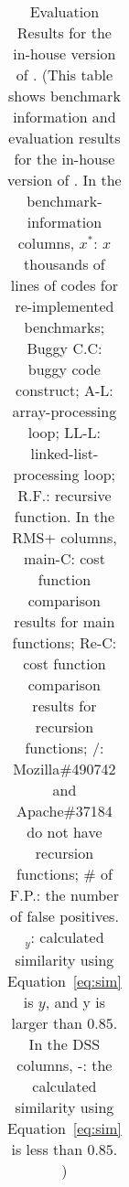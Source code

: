 \begin{table}[h!]
{{\begin{tabular}{lccccccccccc}


    \bottomrule
   \end{tabular}
   }
   }
   \caption{Evaluation Results for the in-house version of \Tool.
  \footnotesize{(This table shows benchmark information and evaluation results for the in-house version of \Tool. In the benchmark-information columns,
   $x^*$: $x$ thousands of lines of codes for re-implemented benchmarks; 
   Buggy C.C: buggy code construct;
   A-L: array-processing loop; 
   LL-L: linked-list-processing loop;
   R.F.: recursive function.
   In the RMS+ columns,
   main-C: cost function comparison results for main functions;
   Re-C: cost function comparison results for recursion functions;
   /: Mozilla\#490742 and Apache\#37184 do not have recursion functions; 
   \# of F.P.: the number of false positives. 
   $_{y}$: calculated similarity using Equation~\ref{eq:sim} is $y$, and y is larger than $0.85$. 
    In the DSS columns, 
    -: the calculated similarity using Equation~\ref{eq:sim} is less than $0.85$.     
)}}
  \label{tab:benchmark_info}
\vspace{-0.4in}
\end{table}